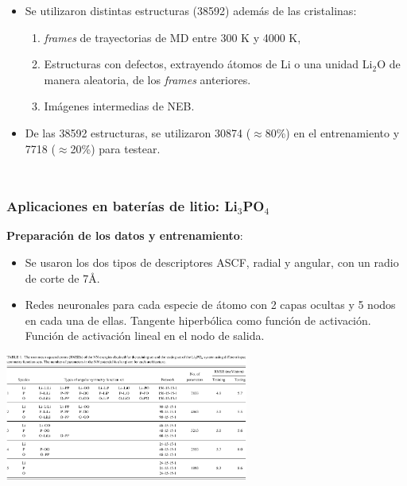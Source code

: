 \documentclass[aspectratio=169]{beamer}
\let\oldtextbf\textbf
\renewcommand{\textbf}[1]{\textcolor{nordblue}{\oldtextbf{#1}}}
\begin{document}
\begin{frame}
\begin{columns}
\begin{itemize}
                \pause

                \item Se utilizaron distintas estructuras (38592) además de las 
                    cristalinas:
                    \begin{enumerate}
                        \item \textit{frames} de trayectorias de MD entre 300 K
                            y 4000 K,
                        \item Estructuras con defectos, extrayendo átomos de Li o
                            una unidad Li$_2$O de manera aleatoria, de los 
                            \textit{frames} anteriores.
                        \item Imágenes intermedias de NEB.
                    \end{enumerate}
                \item De las 38592 estructuras, se utilizaron 30874 
                    ($\approx$80\%) en el entrenamiento y 7718 ($\approx$20\%) 
                    para testear.
            \end{itemize}
        \end{columns}

    \end{frame}
    
    \begin{frame}
        \frametitle{Aplicaciones en baterías de litio: Li$_3$PO$_4$}
            
        \textbf{Preparación de los datos y entrenamiento}:
        \begin{itemize}
            \item Se usaron los dos tipos de descriptores ASCF, radial y angular, 
                con un radio de corte de 7\AA.
            \item Redes neuronales para cada especie de átomo con 2 capas ocultas
                y 5 nodos en cada una de ellas. Tangente hiperbólica como función
                de activación. Función de activación lineal en el nodo de salida.
        \end{itemize}

        \pause

        \begin{center}
            \includegraphics[width=0.6\textwidth]{Li3PO4-rmse.png}
        \end{center}

    \end{frame}
    
\end{document}

